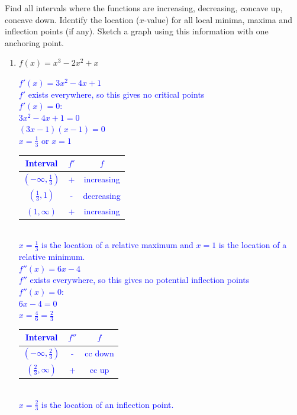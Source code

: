 \documentclass{ximera}
\begin{document}
\begin{exercise}
    Find all intervals where the functions are increasing, decreasing, concave up, concave down.  Identify the location ($x$-value) for all local minima, maxima and inflection points (if any).   Sketch a graph using this information with one anchoring point.\\
\begin{enumerate}
    \item $f(x)=x^3-2x^2+x$\\
    \textcolor{blue}{$f'(x)=3x^2-4x+1$\\
    $f'$ exists everywhere, so this gives no critical points\\
    $f'(x)=0$: \\
    $3x^2-4x+1=0$\\
    $(3x-1)(x-1)=0$\\
    $x=\frac{1}{3}$ or $x=1$\\
    \begin{tabular}{c|c|c}
       Interval  & $f'$ & $f$  \\ \hline
       $(-\infty, \frac13)$ & + & increasing \\
       $(\frac{1}{3},1)$ & - & decreasing\\
       $(1,\infty)$ & + & increasing\\
    \end{tabular}\\
    $x=\frac13$ is the location of a relative maximum and $x=1$ is the location of a relative minimum.\\
    $f''(x)=6x-4$\\
    $f''$ exists everywhere, so this gives no potential inflection points\\
    $f''(x)=0$:\\
    $6x-4=0$\\
    $x=\frac{4}{6}=\frac{2}{3}$\\
    \begin{tabular}{c|c|c}
       Interval  &  $f''$ & $f$ \\ \hline
       $(-\infty,\frac23)$ & -  & cc down\\
       $(\frac23,\infty)$ & + & cc up\\
    \end{tabular}\\
    $x=\frac23$ is the location of an inflection point.\\
    \begin{image} 
        \begin{tikzpicture}[scale=1.5]

\end{tikzpicture}
\end{image}}
\end{enumerate}
\end{exercise}
\end{document}
